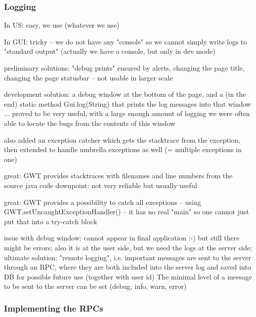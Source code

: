 \subsubsection{Logging}

In US: easy, we use (whatever we use)


In GUI: tricky -- we do not have any "console" so we cannot simply write logs to "standard output"
(actually we have a console, but only in dev mode)

preliminary solutions: "debug prints" ensured by alerts, changing the page title, changing the page statusbar -- not usable in larger scale

development solution: a debug window at the bottom of the page, and a (in the end) static method Gui.log(String) that prints the log messages into that window
... proved to be very useful, with a large enough amount of logging we were often able to locate the bugs from the contents of this window

also added an exception catcher which gets the stacktrace from the exception, then extended to handle umbrella exceptions as well (= multiple exceptions in one)

great: GWT provides stacktraces with filenames and line numbers from the source java code
downpoint: not very reliable but usually useful

great: GWT provides a possibility to catch all exceptions -- using GWT.setUncaughtExceptionHandler() -- it has no real "main" so one cannot just put that into a try-catch block

issue with debug window: cannot appear in final application :-) but still there might be errors;
also it is at the user side, but we need the logs at the server side;
ultimate solution: "remote logging", i.e. important messages are sent to the server through an RPC, where they are both included into the server log and saved into DB for possible future use (together with user id)
The minimal level of a meesage to be sent to the server can be set (debug, info, warn, error)

\subsubsection{Implementing the RPCs}

